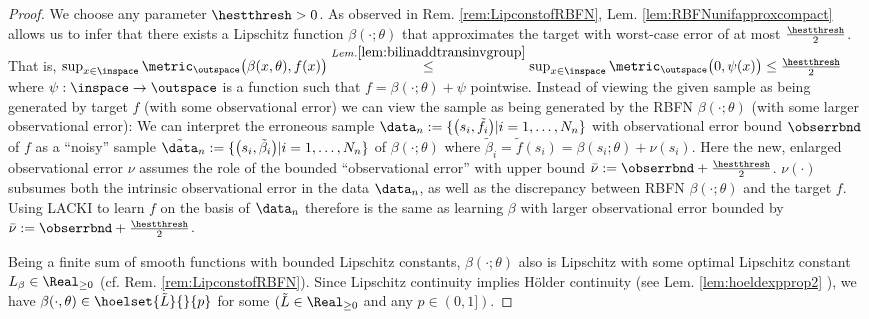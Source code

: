 \begin{proof}
We choose any parameter $\hestthresh >0$. As observed in Rem. \ref{rem:LipconstofRBFN}, Lem. \ref{lem:RBFNunifapproxcompact} allows us to infer that there exists a Lipschitz function $\beta(\cdot;\theta)$ that approximates the target with worst-case error of at most $\frac \hestthresh 2$. That is, $\sup_{x \in \inspace} \metric_\outspace\bigl(\beta(x,\theta), f(x) \bigr) \stackrel{Lem. \ref{lem:bilinaddtransinvgroup}}{\leq} \sup_{x \in \inspace} \metric_\outspace\bigl(0, \psi(x) \bigr) \leq \frac \hestthresh 2$ where $\psi:\inspace \to \outspace$ is a function such that $f= \beta(\cdot;\theta) + \psi$ pointwise.
Instead of viewing the given sample as being generated by target $f$ (with some observational error) we can view the sample as being generated by the RBFN $\beta(\cdot;\theta)$ (with some larger observational error): 
We can interpret the erroneous sample $\data_n:= \{\bigl( s_i, \tilde f_i\bigr) \vert i=1,\ldots, N_n\} $ with observational error bound $\obserrbnd$ of $f$ as a ``noisy'' sample $\tilde \data_n:= \{\bigl( s_i, \tilde \beta_i \bigr) \vert i=1,\ldots, N_n\}$ of $\beta(\cdot;\theta)$ where $\tilde \beta_i = \tilde f(s_i) = \beta(s_i;\theta)+\nu(s_i) $. Here the new, enlarged observational error $\nu$ assumes the role of the  bounded ``observational error'' with upper bound $\bar \nu := \obserrbnd + \frac \hestthresh 2$. $\nu(\cdot)$ subsumes both the intrinsic observational error in the data $\data_n$, as well as the discrepancy between RBFN $\beta(\cdot;\theta)$ and the target $f$. Using LACKI to learn $f$ on the basis of $\data_n$ therefore is the same as learning $\beta$ with larger observational error bounded by $\bar \nu := \obserrbnd + \frac \hestthresh 2$.


Being a finite sum of smooth functions with bounded Lipschitz constants, $\beta(\cdot;\theta)$ also is Lipschitz with some optimal Lipschitz constant $L_\beta \in \Real_{\geq 0}$ (cf. Rem. \ref{rem:LipconstofRBFN}).
Since Lipschitz continuity implies H\"older continuity (see Lem. \ref{lem:hoeldexpprop2} ), we have $\beta(\cdot,\theta) \in \hoelset {\tilde L}{ }{p}$ for some $(\tilde L \in \Real_{\geq 0}$ and any $p \in (0,1])$.


\end{proof}
